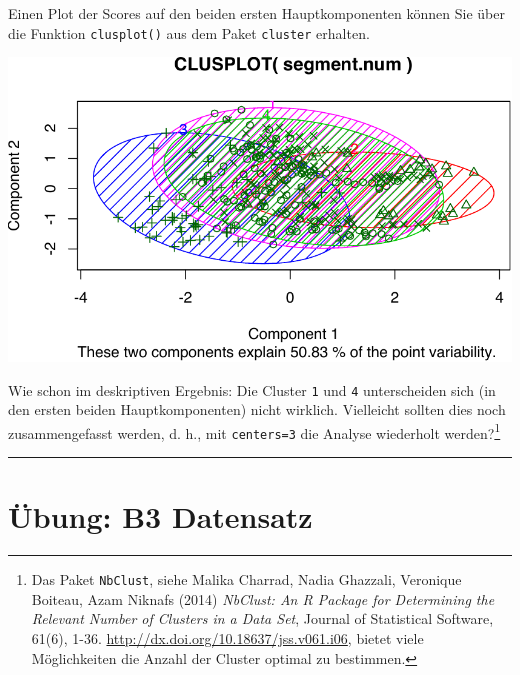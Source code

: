 \documentclass[12pt,ngerman,]{book}
\newenvironment{Shaded}{\begin{snugshade}}{\end{snugshade}}
\newcommand{\KeywordTok}[1]{\textcolor[rgb]{0.13,0.29,0.53}{\textbf{{#1}}}}
\newcommand{\DataTypeTok}[1]{\textcolor[rgb]{0.13,0.29,0.53}{{#1}}}
\newcommand{\DecValTok}[1]{\textcolor[rgb]{0.00,0.00,0.81}{{#1}}}
\newcommand{\OtherTok}[1]{\textcolor[rgb]{0.56,0.35,0.01}{{#1}}}
\newcommand{\NormalTok}[1]{{#1}}
\let\rmarkdownfootnote\footnote%
\def\footnote{\protect\rmarkdownfootnote}
\renewenvironment{Shaded}{\begin{kframe}}{\end{kframe}}
\begin{document}
Einen Plot der Scores auf den beiden ersten Hauptkomponenten können Sie
über die Funktion \texttt{clusplot()} aus dem Paket \texttt{cluster}
erhalten.

\begin{Shaded}
\end{Shaded}

\begin{center}\includegraphics[width=0.7\linewidth]{082_Clusteranalyse_files/figure-latex/unnamed-chunk-8-1} \end{center}

Wie schon im deskriptiven Ergebnis: Die Cluster \texttt{1} und
\texttt{4} unterscheiden sich (in den ersten beiden Hauptkomponenten)
nicht wirklich. Vielleicht sollten dies noch zusammengefasst werden, d.
h., mit \texttt{centers=3} die Analyse wiederholt werden?\footnote{Das
  Paket \texttt{NbClust}, siehe Malika Charrad, Nadia Ghazzali,
  Veronique Boiteau, Azam Niknafs (2014) \emph{NbClust: An R Package for
  Determining the Relevant Number of Clusters in a Data Set}, Journal of
  Statistical Software, 61(6), 1-36.
  \url{http://dx.doi.org/10.18637/jss.v061.i06}, bietet viele
  Möglichkeiten die Anzahl der Cluster optimal zu bestimmen.}

\begin{center}\rule{0.5\linewidth}{\linethickness}\end{center}

\section{Übung: B3 Datensatz}\label{ubung-b3-datensatz}
\end{document}

